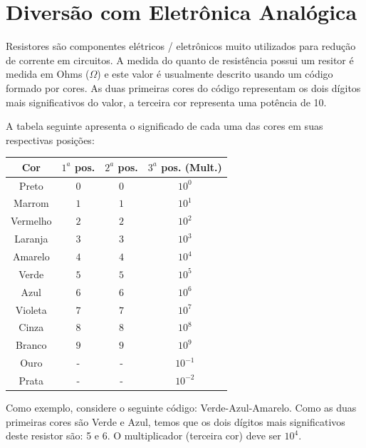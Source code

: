 \documentclass[11pt,a4paper]{article}
\begin{document}
\section{Divers\~ao com Eletr\^onica Anal\'ogica}



Resistores s\~ao componentes el\'etricos / eletr\^onicos muito utilizados para redu\c{c}\~ao de corrente em circuitos.
A medida do quanto de resist\^encia possui um resitor \'e medida em Ohms ($\Omega$) e este valor \'e usualmente
descrito usando um c\'odigo formado por cores. As duas primeiras cores do c\'odigo representam os dois d\'igitos mais
significativos do valor, a terceira cor representa uma pot\^encia de 10.

A tabela seguinte apresenta o significado de cada uma das cores em suas respectivas posi\c{c}\~oes:
	      \begin{center}
              \begin{tabular}{|c|c|c|c|}
                  \hline
		  Cor      & $1^{a}$ pos. & $2^{a}$ pos. & $3^{a}$ pos. (Mult.)\\\hline
                  Preto    & $0$          &  $0$         & $ 10^{0}$      \\\hline
                  Marrom   & $1$          &  $1$         & $ 10^{1}$      \\\hline
                  Vermelho & $2$          &  $2$         & $ 10^{2}$      \\\hline
                  Laranja  & $3$          &  $3$         & $ 10^{3}$      \\\hline
                  Amarelo  & $4$          &  $4$         & $ 10^{4}$      \\\hline
                  Verde    & $5$          &  $5$         & $ 10^{5}$      \\\hline
                  Azul     & $6$          &  $6$         & $ 10^{6}$      \\\hline
                  Violeta  & $7$          &  $7$         & $ 10^{7}$      \\\hline
                  Cinza    & $8$          &  $8$         & $ 10^{8}$      \\\hline
                  Branco   & $9$          &  $9$         & $ 10^{9}$      \\\hline
                  Ouro     & -            &   -          & $ 10^{-1}$     \\\hline
                  Prata    & -            &   -          & $ 10^{-2}$     \\\hline
              \end{tabular}
              \end{center}
Como exemplo, considere o seguinte c\'odigo: Verde-Azul-Amarelo. Como as duas primeiras cores s\~ao Verde e Azul,
temos que os dois d\'igitos mais significativos deste resistor s\~ao: 5 e 6. O multiplicador (terceira cor) deve 
ser $10^{4}$. 
\end{document}

